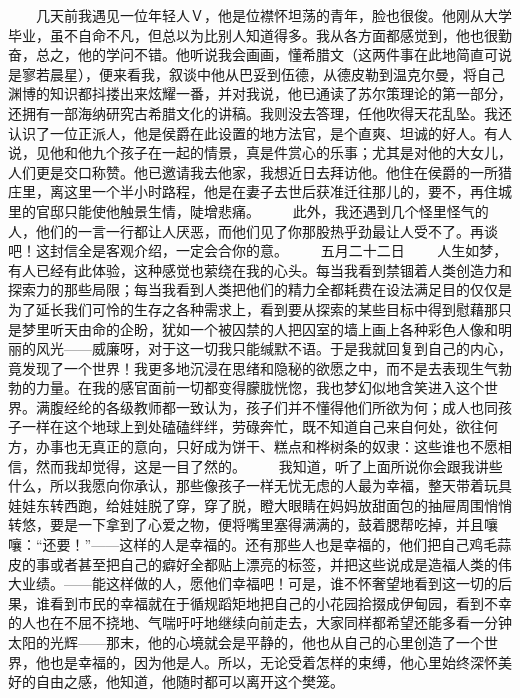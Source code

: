 \documentclass[11pt,oneside]{book}
\begin{document}
\begin{common-format}
　　几天前我遇见一位年轻人Ｖ，他是位襟怀坦荡的青年，脸也很俊。他刚从大学毕业，虽不自命不凡，但总以为比别人知道得多。我从各方面都感觉到，他也很勤奋，总之，他的学问不错。他听说我会画画，懂希腊文（这两件事在此地简直可说是寥若晨星），便来看我，叙谈中他从巴妥到伍德，从德皮勒到温克尔曼，将自己渊博的知识都抖搂出来炫耀一番，并对我说，他已通读了苏尔策理论的第一部分，还拥有一部海纳研究古希腊文化的讲稿。我则没去答理，任他吹得天花乱坠。我还认识了一位正派人，他是侯爵在此设置的地方法官，是个直爽、坦诚的好人。有人说，见他和他九个孩子在一起的情景，真是件赏心的乐事；尤其是对他的大女儿，人们更是交口称赞。他已邀请我去他家，我想近日去拜访他。他住在侯爵的一所猎庄里，离这里一个半小时路程，他是在妻子去世后获准迁往那儿的，要不，再住城里的官邸只能使他触景生情，陡增悲痛。
　　此外，我还遇到几个怪里怪气的人，他们的一言一行都让人厌恶，而他们见了你那股热乎劲最让人受不了。再谈吧！这封信全是客观介绍，一定会合你的意。
　　五月二十二日
　　人生如梦，有人已经有此体验，这种感觉也萦绕在我的心头。每当我看到禁锢着人类创造力和探索力的那些局限；每当我看到人类把他们的精力全都耗费在设法满足目的仅仅是为了延长我们可怜的生存之各种需求上，看到要从探索的某些目标中得到慰藉那只是梦里听天由命的企盼，犹如一个被囚禁的人把囚室的墙上画上各种彩色人像和明丽的风光——威廉呀，对于这一切我只能缄默不语。于是我就回复到自己的内心，竟发现了一个世界！我更多地沉浸在思绪和隐秘的欲愿之中，而不是去表现生气勃勃的力量。在我的感官面前一切都变得朦胧恍惚，我也梦幻似地含笑进入这个世界。满腹经纶的各级教师都一致认为，孩子们并不懂得他们所欲为何；成人也同孩子一样在这个地球上到处磕磕绊绊，劳碌奔忙，既不知道自己来自何处，欲往何方，办事也无真正的意向，只好成为饼干、糕点和桦树条的奴隶：这些谁也不愿相信，然而我却觉得，这是一目了然的。
　　我知道，听了上面所说你会跟我讲些什么，所以我愿向你承认，那些像孩子一样无忧无虑的人最为幸福，整天带着玩具娃娃东转西跑，给娃娃脱了穿，穿了脱，瞪大眼睛在妈妈放甜面包的抽屉周围悄悄转悠，要是一下拿到了心爱之物，便将嘴里塞得满满的，鼓着腮帮吃掉，并且嚷嚷：“还要！”——这样的人是幸福的。还有那些人也是幸福的，他们把自己鸡毛蒜皮的事或者甚至把自己的癖好全都贴上漂亮的标签，并把这些说成是造福人类的伟大业绩。——能这样做的人，愿他们幸福吧！可是，谁不怀奢望地看到这一切的后果，谁看到市民的幸福就在于循规蹈矩地把自己的小花园拾掇成伊甸园，看到不幸的人也在不屈不挠地、气喘吁吁地继续向前走去，大家同样都希望还能多看一分钟太阳的光辉——那末，他的心境就会是平静的，他也从自己的心里创造了一个世界，他也是幸福的，因为他是人。所以，无论受着怎样的束缚，他心里始终深怀美好的自由之感，他知道，他随时都可以离开这个樊笼。
　　


\end{common-format}  
\end{document}
